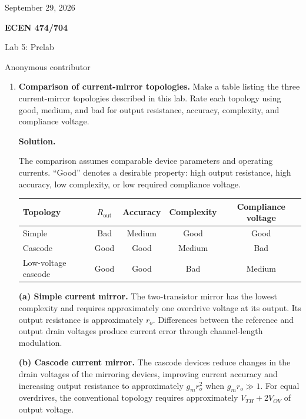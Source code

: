 \documentclass[12pt,letterpaper]{article}
\begin{document}
{\fontsize{11}{12.65}\selectfont
\hfill September 29, 2026\par}
{\centering
{\fontsize{14}{16.1}\selectfont\sffamily\bfseries ECEN 474/704\par}
{\fontsize{14}{16.1}\selectfont Lab 5: Prelab\par}
{\fontsize{14}{16.1}\selectfont Anonymous contributor\par}
}
\vspace{12pt}
\begin{enumerate}

\item \textbf{Comparison of current-mirror topologies.}
Make a table listing the three current-mirror topologies described in
this lab. Rate each topology using good, medium, and bad for output
resistance, accuracy, complexity, and compliance voltage.

\textbf{Solution.}

The comparison assumes comparable device parameters and operating
currents. ``Good'' denotes a desirable
property: high output resistance, high accuracy, low complexity, or
low required compliance voltage.

\begin{center}
\small
\setlength{\tabcolsep}{5pt}
\begin{tabular}{@{}lcccc@{}}
\toprule
Topology & $R_{\mathrm{out}}$ & Accuracy & Complexity & Compliance voltage\\
\midrule
Simple & Bad & Medium & Good & Good\\
Cascode & Good & Good & Medium & Bad\\
Low-voltage cascode & Good & Good & Bad & Medium\\
\bottomrule
\end{tabular}
\end{center}

\textbf{(a) Simple current mirror.}
The two-transistor mirror has the lowest complexity and requires
approximately one overdrive voltage at its output. Its output
resistance is approximately $r_o$. Differences between the reference
and output drain voltages produce current error through
channel-length modulation.

\textbf{(b) Cascode current mirror.}
The cascode devices reduce changes in the drain voltages of the
mirroring devices, improving current accuracy and increasing output
resistance to approximately $g_mr_o^2$ when $g_mr_o\gg1$.
For equal overdrives, the conventional topology requires approximately
$V_{TH}+2V_{OV}$ of output voltage.


\end{enumerate}
\end{document}

